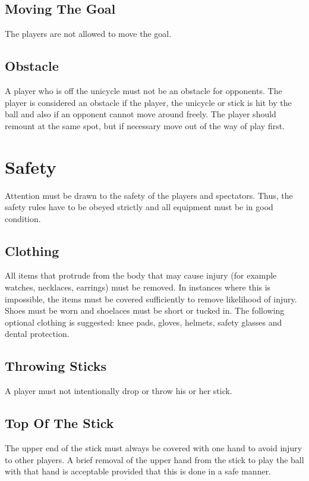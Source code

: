 \subsection{Moving The Goal}
The players are not allowed to move the goal.

\subsection{Obstacle}
A player who is off the unicycle must not be an obstacle for opponents.
The player is considered an obstacle if the player, the unicycle or stick is hit by the ball and also if an opponent cannot move around freely.
The player should remount at the same spot, but if necessary move out of the way of play first.

\section{Safety}

Attention must be drawn to the safety of the players and spectators.
Thus, the safety rules have to be obeyed strictly and all equipment must be in good condition.

\subsection{Clothing \label{subsec:hockey_safety_clothing}}
All items that protrude from the body that may cause injury (for example watches, necklaces, earrings) must be removed.
In instances where this is impossible, the items must be covered sufficiently to remove likelihood of injury.
Shoes must be worn and shoelaces must be short or tucked in.
The following optional clothing is suggested: knee pads, gloves, helmets, safety glasses and dental protection.

\subsection{Throwing Sticks}
A player must not intentionally drop or throw his or her stick.

\subsection{Top Of The Stick}
The upper end of the stick must always be covered with one hand to avoid injury to other players.
A brief removal of the upper hand from the stick to play the ball with that hand is acceptable provided that this is done in a safe manner.

